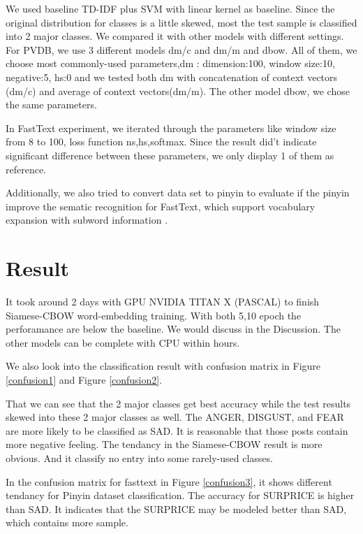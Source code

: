 We used baseline TD-IDF plus SVM with linear kernel as baseline. 
Since the original distribution for classes is a little skewed, most the test sample is classified into 2 major classes.
We compared it with other models with different settings. \\

For PVDB, we use 3 different models dm/c and dm/m and dbow. All of them, we choose most commonly-used parameters,dm : dimension:100, window size:10, negative:5, hs:0 and we tested both dm with concatenation of context vectors (dm/c) and average of context vectors(dm/m). 
The other model dbow, we chose the same parameters.

In FastText experiment, we iterated through the parameters like window size from 8 to 100, 
loss function ns,hs,softmax.  Since the result did't indicate significant difference between these parameters, 
we only display 1 of them as reference.

Additionally, we also tried to convert data set to pinyin to evaluate 
if the pinyin improve the sematic recognition for FastText, 
which support vocabulary expansion with subword information \cite{bojanowski2016enriching}. 

\section{Result}

It took around 2 days with GPU NVIDIA TITAN X (PASCAL) to finish Siamese-CBOW word-embedding training. With both 5,10 epoch the perforamance are below the baseline. 
We would discuss in the Discussion. The other models can be complete with CPU within hours.

We also look into the classification result with confusion matrix in Figure \ref{confusion1} and Figure \ref{confusion2}.

That we can see that the 2 major classes get best accuracy while the test results skewed into these 2 major classes as well.  
The ANGER, DISGUST, and FEAR are more likely to be classified as SAD. It is reasonable that those posts contain more negative feeling.
The tendancy in the Siamese-CBOW result is more obvious. And it classify no entry into some rarely-used classes.

In the confusion matrix for fasttext in Figure \ref{confusion3}, it shows different tendancy for Pinyin dataset classification. 
The accuracy for SURPRICE is higher than SAD. It indicates that the SURPRICE may be modeled better than SAD, which contains more sample.

